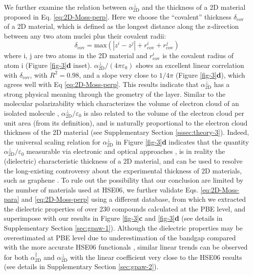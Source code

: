 \documentclass[journal=ancac3,manuscript=article,email=true,hyperref=true,keywords=false]{achemso}
\begin{document}
We further examine the relation between $\alpha_{\mathrm{2D}}^{\perp}$ and the
thickness of a 2D material proposed in
Eq. \ref{eq:2D-Moss-perp}. Here we choose the ``covalent'' thickness
$\delta_{\mathrm{cov}}$ of a 2D material, which is defined as the
longest distance along the z-direction between any two atom nuclei
plus their covalent radii:
%
%
\begin{equation}
  \label{eq:cov-thick}
  \delta_{\mathrm{cov}} = \mathrm{max}(|z^{i} - z^{j}|
  + r^{i}_{\mathrm{cov}} + r^{j}_{\mathrm{cov}})
\end{equation}
where i, j are two atoms in the 2D material and $r_{\mathrm{cov}}^{i}$
is the covalent radius of atom i (Figure \ref{fig-3}{\bf d} inset). 
%
%
$\alpha_{\mathrm{2D}}^{\perp}/(4 \pi \varepsilon_{0})$ shows an
excellent linear correlation with $\delta_{\mathrm{cov}}$, with
$R^{2}=0.98$, and a slope very close to $1/4\pi$ (Figure
\ref{fig-3}{\bf d}), which agrees well with Eq \ref{eq:2D-Moss-perp}.
This results indicate that $\alpha_{\mathrm{2D}}^{\perp}$ has a strong
physical meaning through the geometry of the layer.  Similar to the
molecular polarizability which characterizes the volume of electron
cloud of an isolated molecule \cite{Israelachvili_2011},
$\alpha_{\mathrm{2D}}^{\perp}/\varepsilon_{0}$ is also related to the
volume of the electron cloud per unit area (from its definition), and
is naturally proportional to the electron cloud thickness of the 2D
material (see Supplementary Section \ref{sssec:theory-3}). Indeed, the
universal scaling relation for $\alpha_{\mathrm{2D}}^{\perp}$ in
Figure \ref{fig-3}{\bf d} indicates that the quantity
$\alpha_{\mathrm{2D}}^{\perp}/\varepsilon_{0}$ measurable via
electronic and optical approaches
\cite{Antoine_1999,Cherniavskaya_2003,Krauss_1999_EFM,Pedersen_2016,Klein_2016,Roch_2018},
is in reality the (dielectric) characteristic thickness of a 2D
material, and can be used to resolve the long-existing controversy
about the experimental thickness of 2D materials, such as graphene
\cite{Shearer_2016}.
%
To rule out the possibility that our conclusion are limited by the
number of materials used at HSE06, we further validate
Eqs. \ref{eq:2D-Moss-para} and \ref{eq:2D-Moss-perp} using a different
database\cite{Haastrup_2018}, from which we extracted the dielectric
properties of over 230 compounds calculated at the PBE level, and
superimpose with our results in Figure \ref{fig-3}{\bf c} and
\ref{fig-3}{\bf d} (see details in Supplementary Section
\ref{sec:gpaw-1}). Although the dielectric properties may be
overestimated at PBE level due to underestimation of the bandgap
compared with the more accurate HSE06 functionals
\cite{Van_Dyck_2017}, similar linear trends can be observed for both
$\alpha^{\parallel}_{\mathrm{2D}}$ and $\alpha_{\mathrm{2D}}^{\perp}$
with the linear coefficient very close to the HSE06 results (see
details in Supplementary Section \ref{sec:gpaw-2}).
\end{document}
